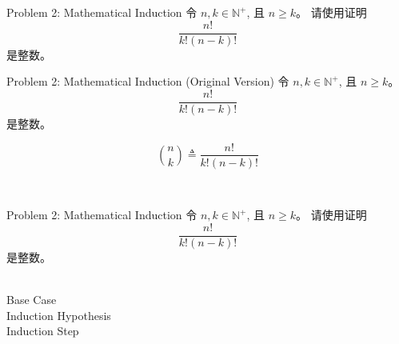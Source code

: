 
\begin{frame}{}
  \begin{exampleblock}{Problem 2: Mathematical Induction}
    令 $n, k \in \mathbb{N}^{+}$, 且 $n \ge k$。
    请使用证明 
    \[
      \frac{n!}{k! (n-k)!}
    \]
    是整数。
  \end{exampleblock}
\end{frame}

\begin{frame}{}
  \begin{exampleblock}{Problem 2: Mathematical Induction (Original Version)}
    令 $n, k \in \mathbb{N}^{+}$, 且 $n \ge k$。
    \[
      \frac{n!}{k! (n-k)!}
    \]
    是整数。
  \end{exampleblock}

  \pause
  \[
    {n \choose k} \triangleq \frac{n!}{k! (n-k)!}
  \]

  \pause
  \begin{center}
      \\[15pt] \pause

  \end{center}
\end{frame}

\begin{frame}{}
  \begin{exampleblock}{Problem 2: Mathematical Induction}
    令 $n, k \in \mathbb{N}^{+}$, 且 $n \ge k$。
    请使用证明 
    \[
      \frac{n!}{k! (n-k)!}
    \]
    是整数。
  \end{exampleblock}

  \pause
  \vspace{0.30cm}
  \begin{center}
     \\[15pt]

    Base Case \\[8pt]
    Induction Hypothesis \\[8pt]
    Induction Step \\[15pt]

  \end{center}
\end{frame}

